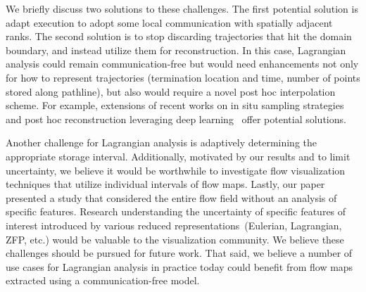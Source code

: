 We briefly discuss two solutions to these challenges.
%
The first potential solution is adapt execution to adopt some local communication with spatially adjacent ranks.
%
%
%
The second solution is to stop discarding trajectories that hit the domain boundary, and instead utilize them for reconstruction. 
%
In this case, Lagrangian analysis could remain communication-free but would need enhancements not only for how to represent trajectories (termination location and time, number of points stored along pathline), but also would require a novel post hoc interpolation scheme.
%
For example, extensions of recent works on in situ sampling strategies~\cite{sane2019interpolation, rapp2019void} and post hoc reconstruction leveraging deep learning~\cite{jakob2020fluid} offer potential solutions.
%
%
%

Another challenge for Lagrangian analysis is adaptively determining the appropriate storage interval. 
%
%
Additionally, motivated by our results and to limit uncertainty, we believe it would be worthwhile to investigate flow visualization techniques that utilize individual intervals of flow maps.
%
Lastly, our paper presented a study that considered the entire flow field without an analysis of specific features.
%
Research understanding the uncertainty of specific features of interest introduced by various reduced representations~(Eulerian, Lagrangian, ZFP, etc.) would be valuable to the visualization community.
%
We believe these challenges should be pursued for future work. 
%
That said, we believe a number of use cases for Lagrangian analysis in practice today could benefit from flow maps extracted using a communication-free model.


